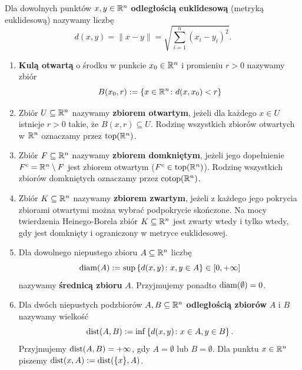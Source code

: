 \begin{defi}
    Dla dowolnych punktów $x, y \in \mathbb{R}^{n}$ \textbf{odległością euklidesową} (metryką euklidesową) nazywamy liczbę
    \begin{equation*}
        d(x, y) = \|x - y\| = \sqrt{\sum_{i=1}^n (x_i - y_i)^2}.
    \end{equation*}
    \begin{enumerate}
        \item \textbf{Kulą otwartą} o środku w punkcie $x_0 \in \mathbb{R}^{n}$ i promieniu $r > 0$ nazywamy zbiór
              \begin{equation*}
                  B(x_0, r) := \left\{x \in \mathbb{R}^{n} \colon d(x, x_0) < r \right\}
              \end{equation*}

        \item Zbiór $U \subseteq  \mathbb{R}^{n}$ nazywamy \textbf{zbiorem otwartym}, jeżeli dla każdego $x \in U$ istnieje $r > 0$ takie, że $B(x, r) \subseteq  U$.
              Rodzinę wszystkich zbiorów otwartych w $\mathbb{R}^{n}$ oznaczamy przez $\mathrm{top}(\mathbb{R}^{n})$.

        \item Zbiór $F \subseteq  \mathbb{R}^{n}$ nazywamy \textbf{zbiorem domkniętym}, jeżeli jego dopełnienie $F^c = \mathbb{R}^{n} \setminus F$ jest zbiorem otwartym ($F^c \in \mathrm{top}(\mathbb{R}^{n})$).
              Rodzinę wszystkich zbiorów domkniętych oznaczamy przez $\mathrm{cotop}(\mathbb{R}^{n})$.

        \item Zbiór $K \subseteq  \mathbb{R}^{n}$ nazywamy \textbf{zbiorem zwartym}, jeżeli z każdego jego pokrycia zbiorami otwartymi można wybrać podpokrycie skończone. Na mocy twierdzenia Heinego-Borela zbiór $K \subseteq  \mathbb{R}^{n}$ jest zwarty wtedy i tylko wtedy, gdy jest domknięty i ograniczony w metryce euklidesowej.

        \item Dla dowolnego niepustego zbioru $A \subseteq \mathbb{R}^{n}$ liczbę
              \begin{equation*}
                  \operatorname{diam}(A) := \sup\left\{d(x, y) \colon x, y \in A \right\} \in [0, +\infty]
              \end{equation*} nazywamy \textbf{średnicą zbioru} $A$. Przyjmujemy ponadto $\operatorname{diam}(\emptyset) = 0$.
        \item Dla dwóch niepustych podzbiorów $A, B \subseteq \mathbb{R}^{n}$ \textbf{odległością zbiorów} $A$ i $B$ nazywamy wielkość
              \begin{equation*}
                  \operatorname{dist}(A, B) := \inf\left\{d(x, y) \colon x \in A,  y \in B \right\}.
              \end{equation*}
              Przyjmujemy $\operatorname{dist}(A, B) = +\infty$, gdy $A = \emptyset$ lub $B = \emptyset$. Dla punktu $x \in \mathbb{R}^{n}$ piszemy $\operatorname{dist}(x, A) := \operatorname{dist}(\{x\}, A)$.
    \end{enumerate}
\end{defi}

